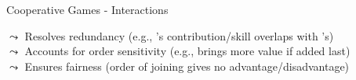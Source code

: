 \documentclass[10pt,compress,t,notes=noshow, xcolor=table]{beamer}
\begin{document}
\begin{framev}[align=top]{Cooperative Games - Interactions}
\begin{itemizeM}
$\leadsto$ Resolves redundancy (e.g., ’s contribution/skill overlaps with ’s)\\
$\leadsto$ Accounts for order sensitivity (e.g.,  brings more value if added last)\\
$\leadsto$ Ensures fairness (order of joining gives no advantage/disadvantage)
\end{itemizeM}
\end{framev}
\end{document}
